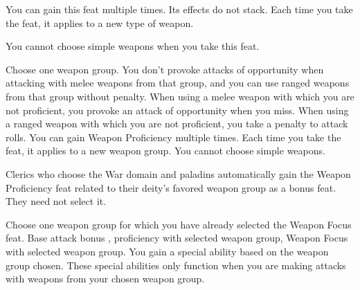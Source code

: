  You can gain this feat multiple times. Its effects do not stack. Each time you take the feat, it applies to a new type of weapon.
\par You cannot choose simple weapons when you take this feat.

Choose one weapon group.
 You don't provoke attacks of opportunity when attacking with melee weapons from that group, and you can use ranged weapons from that group without penalty.
 When using a melee weapon with which you are not proficient, you provoke an attack of opportunity when you miss. When using a ranged weapon with which you are not proficient, you take a  penalty to attack rolls.
 You can gain Weapon Proficiency multiple times. Each time you take the feat, it applies to a new weapon group. You cannot choose simple weapons.
\par Clerics who choose the War domain and paladins automatically gain the Weapon Proficiency feat related to their deity's favored weapon group as a bonus feat. They need not select it.

Choose one weapon group for which you have already selected the Weapon Focus feat.
 Base attack bonus , proficiency with selected weapon group, Weapon Focus with selected weapon group.
\featben You gain a special ability based on the weapon group chosen. These special abilities only function when you are making attacks with weapons from your chosen weapon group.

